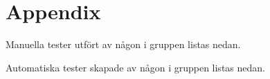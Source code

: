 \documentclass[10pt]{article}
\begin{document}
\pagebreak
\setlength{\parindent}{0pt}
\section{Appendix}
Manuella tester utfört av någon i gruppen listas nedan.
\label{sec:test_scoreboard}
 
\vspace{5mm}
\label{sec:test_spelkontroll}
 
\vspace{5mm}
\label{sec:controller_disconnect}
 
\vspace{5mm}
\label{sec:controller_new_session}
 
\vspace{5mm}
\label{sec:controller_update_playercount}
 
\vspace{5mm}
\label{sec:controller_view_session}
 
\vspace{5mm}
\label{sec:controller_view_started}
 
\vspace{5mm}
\label{sec:ui_connect}
 
\vspace{5mm}

\pagebreak
Automatiska tester skapade av någon i gruppen listas nedan.
\pagebreak

\printbibliography	
	
\end{document}
